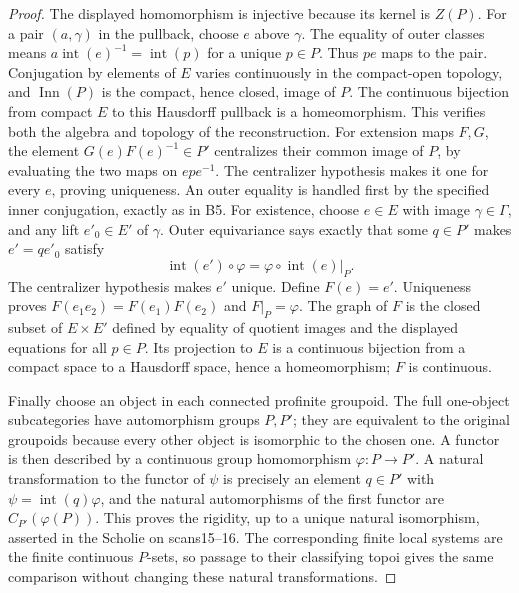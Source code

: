 \begin{proof}
The displayed homomorphism is injective because its kernel is
$Z(P)$. For a pair $(a,\gamma)$ in the pullback, choose $e$ above
$\gamma$. The equality of outer classes means
$a\operatorname{int}(e)^{-1}=\operatorname{int}(p)$ for a unique
$p\in P$. Thus $pe$ maps to the pair. Conjugation by elements of
$E$ varies continuously in the compact-open topology, and
$\operatorname{Inn}(P)$ is the compact, hence closed, image of $P$.
The continuous bijection from compact $E$ to this Hausdorff
pullback is a homeomorphism. This verifies both the algebra and
topology of the reconstruction.
For extension maps $F,G$, the element $G(e)F(e)^{-1}\in P'$
centralizes their common image of $P$, by evaluating the two maps
on $epe^{-1}$. The centralizer hypothesis makes it one for every
$e$, proving uniqueness. An outer equality is handled first by
the specified inner conjugation, exactly as in B5.
For existence, choose $e\in E$ with image $\gamma\in\Gamma$, and
any lift $e'_0\in E'$ of $\gamma$. Outer equivariance says exactly
that some $q\in P'$ makes $e'=qe'_0$ satisfy
\[
 \operatorname{int}(e')\circ\varphi
       =\varphi\circ\operatorname{int}(e)|_P.
\]
The centralizer hypothesis makes $e'$ unique. Define $F(e)=e'$.
Uniqueness proves $F(e_1e_2)=F(e_1)F(e_2)$ and
$F|_P=\varphi$. The graph of $F$ is the closed subset of
$E\times E'$ defined by equality of quotient images and the
displayed equations for all $p\in P$. Its projection to $E$ is a
continuous bijection from a compact space to a Hausdorff space,
hence a homeomorphism; $F$ is continuous.

Finally choose an object in each connected profinite groupoid.
The full one-object subcategories have automorphism groups $P,P'$;
they are equivalent to the original groupoids because every other
object is isomorphic to the chosen one. A functor is then described
by a continuous group homomorphism $\varphi:P\to P'$. A natural
transformation to the functor of $\psi$ is precisely an element
$q\in P'$ with $\psi=\operatorname{int}(q)\varphi$, and the
natural automorphisms of the first functor are
$C_{P'}(\varphi(P))$. This proves the rigidity, up to a unique
natural isomorphism, asserted in the Scholie on scans15--16.
The corresponding finite local systems are the finite continuous
$P$-sets, so passage to their classifying topoi gives the same
comparison without changing these natural transformations.
\end{proof}

